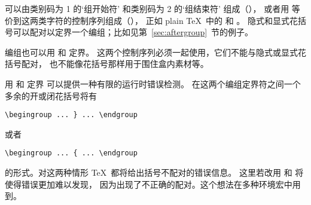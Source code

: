\documentclass{book}
\begin{document}
可以由类别码为 1 的`组开始符'%
和类别码为 2 的`组结束符' 组成（），
或者用  等价到这两类字符的控制序列组成（），
正如 plain \TeX\ 中的  和 。
隐式和显式花括号可以配对以定界一个编组；比如见第~\ref{sec:aftergroup}~节的例子。

编组也可以用  和  定界。
这两个控制序列必须一起使用，它们不能与隐式或显式花括号配对，
也不能像花括号那样用于围住盒内素材等。

用  和  定界%
\label{begin:end:macros}%
可以提供一种有限的运行时错误检测。
在这两个编组定界符之间一个多余的开或闭花括号将有
\begin{verbatim}
\begingroup ... } ... \endgroup
\end{verbatim}
或者
\begin{verbatim}
\begingroup ... { ... \endgroup
\end{verbatim}
的形式。对这两种情形 \TeX\ 都将给出括号不配对的错误信息。
这里若改用  和  将使得错误更加难以发现，
因为出现了不正确的配对。这个想法在多种环境宏中用到。
\end{document}
